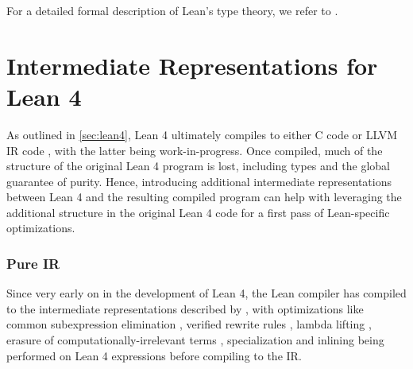 For a detailed formal description of Lean's type theory, we refer to \citep{carneiro_type_2019}.

\section{Intermediate Representations for Lean 4}\label{sec:irs}
As outlined in \cref{sec:lean4}, Lean 4 ultimately compiles to either C code or LLVM IR code \citep{lattner_llvm_2004}, with the latter being work-in-progress. Once compiled, much of the structure of the original Lean 4 program is lost, including types and the global guarantee of purity. Hence, introducing additional intermediate representations between Lean 4 and the resulting compiled program can help with leveraging the additional structure in the original Lean 4 code for a first pass of Lean-specific optimizations.

\subsubsection{Pure IR}
Since very early on in the development of Lean 4, the Lean compiler has compiled to the intermediate representations described by \cite{ullrich_counting_2020}, with optimizations like common subexpression elimination \citep{cocke_global_1970}, verified rewrite rules \citep{jones_playing_2001}, lambda lifting \citep{johnsson_lambda_1985}, erasure of computationally-irrelevant terms \citep{tejiscak_erasure_2019}, specialization \citep{augustsson_implementing_1993} and inlining \citep{jones_secrets_2002} being performed on Lean 4 expressions before compiling to the IR.

